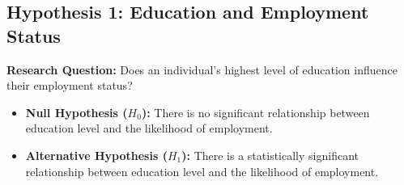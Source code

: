 \subsection{Hypothesis 1: Education and Employment Status}
\textbf{Research Question:} Does an individual's highest level of education influence their employment status?

\begin{itemize}
    \item \textbf{Null Hypothesis ($H_0$):} There is no significant relationship between education level and the likelihood of employment.
    \item \textbf{Alternative Hypothesis ($H_1$):} There is a statistically significant relationship between education level and the likelihood of employment.
\end{itemize}

